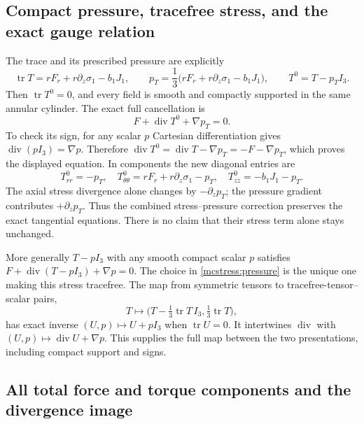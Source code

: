 \subsection{Compact pressure, tracefree stress, and the exact gauge relation}

The trace and its prescribed pressure are explicitly
\begin{equation}\label{mcstress:pressure}
 \operatorname{tr}T=rF_r+r\partial_z\sigma_1-b_1J_1,
 \qquad
 p_T=\frac13\bigl(rF_r+r\partial_z\sigma_1-b_1J_1\bigr),
 \qquad T^0=T-p_TI_3.
\end{equation}
Then $\operatorname{tr}T^0=0$, and every field is smooth and compactly
supported in the same annular cylinder. The exact full cancellation is
\begin{equation}\label{mcstress:tracefree_cancellation}
 F+\operatorname{div}T^0+\nabla p_T=0.
\end{equation}
To check its sign, for any scalar $p$ Cartesian differentiation gives
$\operatorname{div}(pI_3)=\nabla p$. Therefore
$\operatorname{div}T^0=\operatorname{div}T-\nabla p_T
=-F-\nabla p_T$, which proves the displayed equation.
In components the new diagonal entries are
\[
 T^0_{rr}=-p_T,\quad
 T^0_{\theta\theta}=rF_r+r\partial_z\sigma_1-p_T,\quad
 T^0_{zz}=-b_1J_1-p_T.
\]
The axial stress divergence alone changes by $-\partial_zp_T$;
the pressure gradient contributes $+\partial_zp_T$. Thus the combined
stress--pressure correction preserves the exact tangential equations.
There is no claim that their stress term alone stays unchanged.

More generally $T-pI_3$ with any smooth compact scalar $p$ satisfies
$F+\operatorname{div}(T-pI_3)+\nabla p=0$.
The choice in \eqref{mcstress:pressure} is the unique one making
this stress tracefree. The map from symmetric tensors to
tracefree-tensor--scalar pairs,
\[
 T\longmapsto\bigl(T-\tfrac13\operatorname{tr}T\,I_3,
                         \tfrac13\operatorname{tr}T\bigr),
\]
has exact inverse $(U,p)\mapsto U+pI_3$ when $\operatorname{tr}U=0$.
It intertwines $\operatorname{div}$ with
$(U,p)\mapsto\operatorname{div}U+\nabla p$. This supplies the full
map between the two presentations, including compact support and signs.

\subsection{All total force and torque components and the divergence image}

